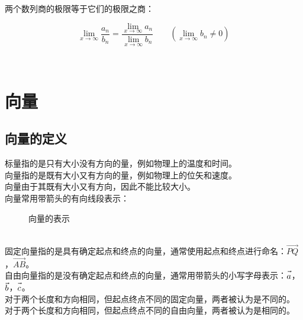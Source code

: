 \documentclass[UTF8]{ctexart}
\let\nvec\vec
\def\vec#1{\nvec{\vphantom b\smash{#1}}}
\begin{document}
    两个数列商的极限等于它们的极限之商：
    \begin{large}
        \begin{equation*}
            \lim_{x\to\infty}\frac{a_{n}}{b_{n}}=\frac{\lim\limits_{x\to\infty}a_{n}}{\lim\limits_{x\to\infty}b_{n}}\qquad\left(\lim_{x\to\infty}b_n\neq 0\right)
        \end{equation*}
    \end{large}\\


\newpage

\section{向量}

\subsection{向量的定义}
    标量指的是只有大小没有方向的量，例如物理上的温度和时间。\\[3mm]
    向量指的是既有大小又有方向的量，例如物理上的位矢和速度。\\[3mm]
    向量由于其既有大小又有方向，因此不能比较大小。\\[3mm]
    向量常用带箭头的有向线段表示：
    \begin{figure}[h]
        \begin{center}
            \caption{向量的表示}
        \end{center}
    \end{figure}\\
    固定向量指的是具有确定起点和终点的向量，通常使用起点和终点进行命名：$\overrightarrow{PQ}$，$\overrightarrow{AB}$。\\[3mm]
    自由向量指的是没有确定起点和终点的向量，通常用带箭头的小写字母表示：$\vec{a}$，$\vec{b}$，$\vec{c}$。\\[3mm]
    对于两个长度和方向相同，但起点终点不同的固定向量，两者被认为是不同的。\\[3mm]
    对于两个长度和方向相同，但起点终点不同的自由向量，两者被认为是相同的。\\[5mm]
\end{document}
